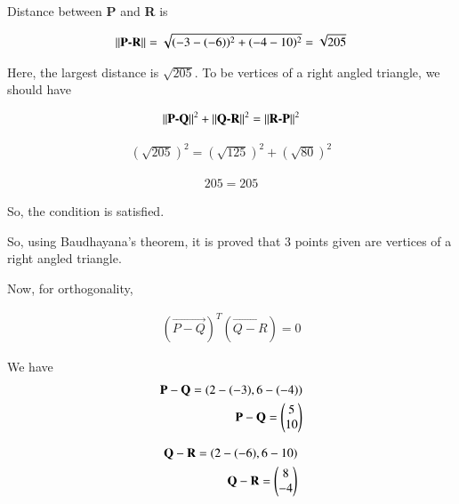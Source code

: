 \documentclass[journal,12pt,twocolumn]{IEEEtran}
\begin{document}
Distance between \textbf{P} and \textbf{R} is 

\begin{align}
\left\lVert\textbf{P-R}\right\rVert = \sqrt{(-3-(-6))^2+(-4-10)^2}
=\sqrt{205}
\end{align}


Here, the largest distance is $\sqrt{205}$. To be vertices of a right angled triangle, we should have 



\begin{align}
  \left\lVert\textbf{P-Q}\right\rVert^2 + \left\lVert\textbf{Q-R}\right\rVert^2 = \left\lVert\textbf{R-P}\right\rVert^2
\end{align}

\begin{align}
  (\sqrt{205})^2 = (\sqrt{125})^2 + (\sqrt{80})^2
\end{align}


\begin{align}
  205 = 205
\end{align}

So, the condition is satisfied. 

So, using Baudhayana's theorem, it is proved that 3 points given are vertices of a right angled triangle. 

Now, for orthogonality, 

\begin{align}
    (\vec{P-Q})^T(\vec{Q-R}) = 0
\end{align}

We have 
\begin{align}
    \mathbf{P-Q} = (2-(-3), 6-(-4))
\\
\mathbf{P-Q} = \begin{pmatrix}
5\\
10 
\end{pmatrix}
\end{align}

\begin{align}
    \mathbf{Q-R} = (2-(-6), 6-10)
\\
\mathbf{Q-R} = \begin{pmatrix}
8\\
-4 
\end{pmatrix}
\end{align}


\end{document}
